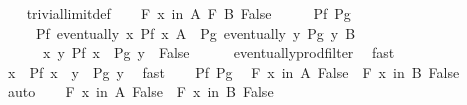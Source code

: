\begin{isabellebody}
%
\isadelimproof
\ \ %
\endisadelimproof
%
\isatagproof
{}\isamarkupfalse%
\ trivial{\isacharunderscore}{\kern0pt}limit{\isacharunderscore}{\kern0pt}def\isanewline
{}\isamarkupfalse%
\isanewline
\ \ \isamarkupfalse%
\ {\isachardoublequoteopen}{\isasymforall}\isactrlsub F\ x\ in\ A\ {\isasymtimes}\isactrlsub F\ B{\isachardot}{\kern0pt}\ False{\isachardoublequoteclose}\isanewline
\ \ \isamarkupfalse%
\ \isamarkupfalse%
\ Pf\ Pg\isanewline
\ \ \ \ \ Pf{\isacharcolon}{\kern0pt}\ {\isachardoublequoteopen}eventually\ {\isacharparenleft}{\kern0pt}{\isasymlambda}x{\isachardot}{\kern0pt}\ Pf\ x{\isacharparenright}{\kern0pt}\ A{\isachardoublequoteclose}\ \ Pg{\isacharcolon}{\kern0pt}\ {\isachardoublequoteopen}eventually\ {\isacharparenleft}{\kern0pt}{\isasymlambda}y{\isachardot}{\kern0pt}\ Pg\ y{\isacharparenright}{\kern0pt}\ B{\isachardoublequoteclose}\isanewline
\ \ \ \ \ {\isacharasterisk}{\kern0pt}{\isacharcolon}{\kern0pt}\ {\isachardoublequoteopen}{\isasymforall}x\ y{\isachardot}{\kern0pt}\ Pf\ x\ {\isasymlongrightarrow}\ Pg\ y\ {\isasymlongrightarrow}\ False{\isachardoublequoteclose}\isanewline
\ \ \ \ \isamarkupfalse%
\ eventually{\isacharunderscore}{\kern0pt}prod{\isacharunderscore}{\kern0pt}filter\ \isamarkupfalse%
\ fast\isanewline
\ \ \isamarkupfalse%
\ {\isacharasterisk}{\kern0pt}\ \isamarkupfalse%
\ {\isachardoublequoteopen}{\isacharparenleft}{\kern0pt}{\isasymforall}x{\isachardot}{\kern0pt}\ {\isasymnot}\ Pf\ x{\isacharparenright}{\kern0pt}\ {\isasymor}\ {\isacharparenleft}{\kern0pt}{\isasymforall}y{\isachardot}{\kern0pt}\ {\isasymnot}\ Pg\ y{\isacharparenright}{\kern0pt}{\isachardoublequoteclose}\ \isamarkupfalse%
\ fast\isanewline
\ \ \isamarkupfalse%
\ Pf\ Pg\ \isamarkupfalse%
\ {\isachardoublequoteopen}{\isacharparenleft}{\kern0pt}{\isasymforall}\isactrlsub F\ x\ in\ A{\isachardot}{\kern0pt}\ False{\isacharparenright}{\kern0pt}\ {\isasymor}\ {\isacharparenleft}{\kern0pt}{\isasymforall}\isactrlsub F\ x\ in\ B{\isachardot}{\kern0pt}\ False{\isacharparenright}{\kern0pt}{\isachardoublequoteclose}\ \isamarkupfalse%
\ auto\isanewline
{}\isamarkupfalse%
\isanewline
\ \ \isamarkupfalse%
\ {\isachardoublequoteopen}{\isacharparenleft}{\kern0pt}{\isasymforall}\isactrlsub F\ x\ in\ A{\isachardot}{\kern0pt}\ False{\isacharparenright}{\kern0pt}\ {\isasymor}\ {\isacharparenleft}{\kern0pt}{\isasymforall}\isactrlsub F\ x\ in\ B{\isachardot}{\kern0pt}\ False{\isacharparenright}{\kern0pt}{\isachardoublequoteclose}\isanewline

\end{isabellebody}
